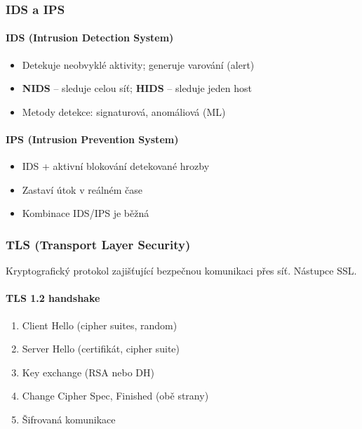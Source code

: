 \subsubsection{IDS a IPS}

\paragraph{IDS (Intrusion Detection System)}
\begin{itemize}
  \item Detekuje neobvyklé aktivity; generuje varování (alert)
  \item \textbf{NIDS} -- sleduje celou síť; \textbf{HIDS} -- sleduje jeden host
  \item Metody detekce: signaturová, anomáliová (ML)
\end{itemize}

\paragraph{IPS (Intrusion Prevention System)}
\begin{itemize}
  \item IDS + aktivní blokování detekované hrozby
  \item Zastaví útok v reálném čase
  \item Kombinace IDS/IPS je běžná
\end{itemize}

\subsubsection{TLS (Transport Layer Security)}

Kryptografický protokol zajišťující bezpečnou komunikaci přes síť. Nástupce SSL.

\paragraph{TLS 1.2 handshake}
\begin{enumerate}
  \item Client Hello (cipher suites, random)
  \item Server Hello (certifikát, cipher suite)
  \item Key exchange (RSA nebo DH)
  \item Change Cipher Spec, Finished (obě strany)
  \item Šifrovaná komunikace
\end{enumerate}

